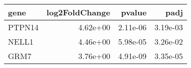 \begin{tabular}{lrrr}
\toprule
  gene &  log2FoldChange &   pvalue &     padj \\
\midrule
PTPN14 &        4.62e+00 & 2.11e-06 & 3.19e-03 \\
 NELL1 &        4.46e+00 & 5.98e-05 & 3.26e-02 \\
  GRM7 &        3.76e+00 & 4.91e-09 & 3.35e-05 \\
\bottomrule
\end{tabular}
